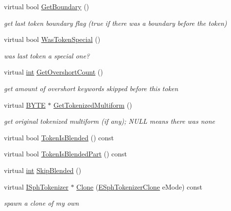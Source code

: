 \begin{DoxyCompactItemize}
virtual bool \hyperlink{classCSphMultiformTokenizer_a45cc5f2a7e9f8ca733cd05fd567d5ca4}{Get\-Boundary} ()
\begin{DoxyCompactList}\small\item\em get last token boundary flag (true if there was a boundary before the token) \end{DoxyCompactList}\item 
virtual bool \hyperlink{classCSphMultiformTokenizer_a524849fe3eb299aa426de560ff181481}{Was\-Token\-Special} ()
\begin{DoxyCompactList}\small\item\em was last token a special one? \end{DoxyCompactList}\item 
virtual \hyperlink{sphinxexpr_8cpp_a4a26e8f9cb8b736e0c4cbf4d16de985e}{int} \hyperlink{classCSphMultiformTokenizer_aa3ce37cc03653d9d38cbea47624ad3f0}{Get\-Overshort\-Count} ()
\begin{DoxyCompactList}\small\item\em get amount of overshort keywords skipped before this token \end{DoxyCompactList}\item 
virtual \hyperlink{sphinxstd_8h_a4ae1dab0fb4b072a66584546209e7d58}{B\-Y\-T\-E} $\ast$ \hyperlink{classCSphMultiformTokenizer_a2eca1b52665347016ccb2b842edd47a0}{Get\-Tokenized\-Multiform} ()
\begin{DoxyCompactList}\small\item\em get original tokenized multiform (if any); N\-U\-L\-L means there was none \end{DoxyCompactList}\item 
virtual bool \hyperlink{classCSphMultiformTokenizer_aae878e23cae6cd69608939522ae26466}{Token\-Is\-Blended} () const 
\item 
virtual bool \hyperlink{classCSphMultiformTokenizer_a6d83e4cc52d2f1e07336666eb236de0d}{Token\-Is\-Blended\-Part} () const 
\item 
virtual \hyperlink{sphinxexpr_8cpp_a4a26e8f9cb8b736e0c4cbf4d16de985e}{int} \hyperlink{classCSphMultiformTokenizer_a3e7c1dfde983502e4daefe871fa49a69}{Skip\-Blended} ()
\item 
virtual \hyperlink{classISphTokenizer}{I\-Sph\-Tokenizer} $\ast$ \hyperlink{classCSphMultiformTokenizer_a058ea8776bfb8b4856e7152c4a6a76fd}{Clone} (\hyperlink{sphinx_8h_adc6a6e1ffce224f14950be604087978c}{E\-Sph\-Tokenizer\-Clone} e\-Mode) const 
\begin{DoxyCompactList}\small\item\em spawn a clone of my own \end{DoxyCompactList}\item 

\end{DoxyCompactItemize}
